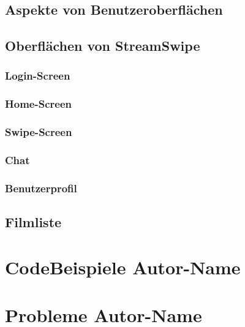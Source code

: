 \documentclass[11pt,a4paper]{article}
\begin{document}
\subsection{Aspekte von Benutzeroberflächen}
\label{sec:UI-Aspekte}


\subsection{Oberflächen von StreamSwipe}


\subsubsection{Login-Screen}
\label{sec:loginscreen}



\subsubsection{Home-Screen}
\label{sec:homescreen}



\subsubsection{Swipe-Screen}
\label{sec:swipescreen}



\subsubsection{Chat}
\label{sec:UI-Chat}



\subsubsection{Benutzerprofil}
\label{sec:benutzerprofil}



\subsection{Filmliste}


\section[CodeBeispiele]{CodeBeispiele \hfill \normalfont \small{Autor-Name}}


\section[Probleme]{Probleme \hfill \normalfont \small{Autor-Name}}
\end{document}
